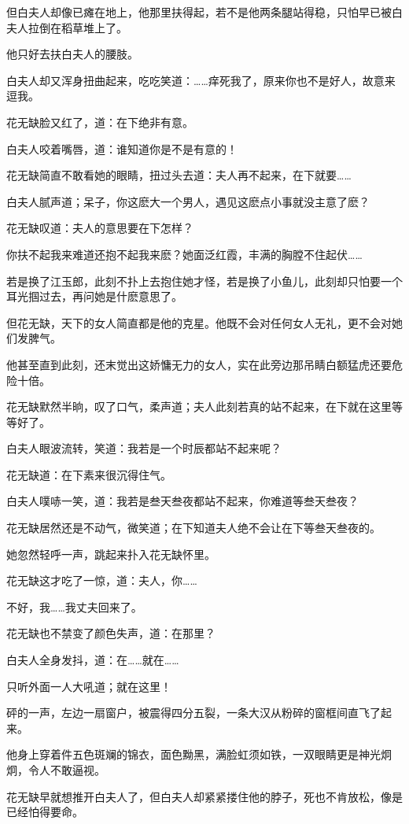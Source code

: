 \documentclass[12pt,oneside]{book}
\begin{document}
但白夫人却像已瘫在地上，他那里扶得起，若不是他两条腿站得稳，只怕早已被白夫人拉倒在稻草堆上了。

他只好去扶白夫人的腰肢。

白夫人却又浑身扭曲起来，吃吃笑道：\ldots\ldots 痒死我了，原来你也不是好人，故意来逗我。

花无缺脸又红了，道：在下绝非有意。

白夫人咬着嘴唇，道：谁知道你是不是有意的！

花无缺简直不敢看她的眼睛，扭过头去道：夫人再不起来，在下就要\ldots\ldots{}

白夫人腻声道；呆子，你这麽大一个男人，遇见这麽点小事就没主意了麽？

花无缺叹道：夫人的意思要在下怎样？

你扶不起我来难道还抱不起我来麽？她面泛红霞，丰满的胸膛不住起伏\ldots\ldots{}

若是换了江玉郎，此刻不扑上去抱住她才怪，若是换了小鱼儿，此刻却只怕要一个耳光掴过去，再问她是什麽意思了。

但花无缺，天下的女人简直都是他的克星。他既不会对任何女人无礼，更不会对她们发脾气。

他甚至直到此刻，还末觉出这娇慵无力的女人，实在此旁边那吊睛白额猛虎还要危险十倍。

花无缺默然半晌，叹了口气，柔声道；夫人此刻若真的站不起来，在下就在这里等等好了。

白夫人眼波流转，笑道：我若是一个时辰都站不起来呢？

花无缺道：在下素来很沉得住气。

白夫人噗哧一笑，道：我若是叁天叁夜都站不起来，你难道等叁天叁夜？

花无缺居然还是不动气，微笑道；在下知道夫人绝不会让在下等叁天叁夜的。

她忽然轻呼一声，跳起来扑入花无缺怀里。

花无缺这才吃了一惊，道：夫人，你\ldots\ldots{}

不好，我\ldots\ldots 我丈夫回来了。

花无缺也不禁变了颜色失声，道：在那里？

白夫人全身发抖，道：在\ldots\ldots 就在\ldots\ldots{}

只听外面一人大吼道；就在这里！

砰的一声，左边一扇窗户，被震得四分五裂，一条大汉从粉碎的窗框间直飞了起来。

他身上穿着件五色斑斓的锦衣，面色黝黑，满脸虹须如铁，一双眼睛更是神光炯炯，令人不敢逼视。

花无缺早就想推开白夫人了，但白夫人却紧紧搂住他的脖子，死也不肯放松，像是已经怕得要命。
\end{document}
